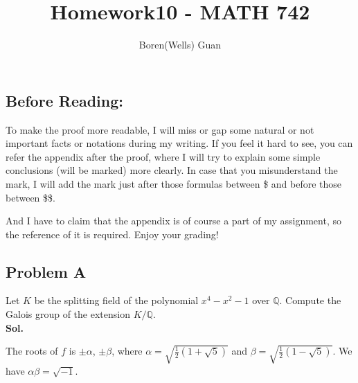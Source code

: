 \documentclass[lang=en,11pt,a4paper,citestyle =authoryear]{elegantpaper}
\title{Homework10 - MATH 742}
\author{Boren(Wells) Guan}
\begin{document}
\maketitle

\subsection*{Before Reading:}\par
To make the proof more readable, I will miss or gap some natural or not important facts or notations during my writing. If you feel it hard to see, you can refer the appendix after the proof, where I will try to explain some simple conclusions (will be marked) more clearly. In case that you misunderstand the mark, I will add the mark just after those formulas between \$ and before those between \$\$.\par
And I have to claim that the appendix is of course a part of my assignment, so the reference of it is required. Enjoy your grading!

\subsection*{Problem A}
Let $K$ be the splitting field of the polynomial $x^4 -x^2 -1$ over $\mathbb{Q}$. Compute the Galois group of the extension $K/\mathbb{Q}$. 
\vspace{0.5em}\\
\textbf{Sol.} \par
\iffalse
    The roots of $f$ is $\pm \alpha$, $\pm\beta$, where $\alpha=\sqrt{\frac{1}{2}(1+\sqrt{5})}$ and $\beta=\sqrt{\frac{1}{2}(1-\sqrt{5})}$. We have $\alpha\beta=\sqrt{-1}.$ 
\end{document}
